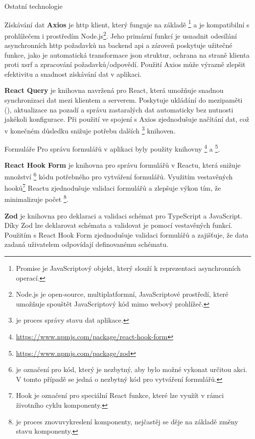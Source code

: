 \begin{subsection}{Ostatní technologie}
\begin{subsubsection}{Získávání dat}
        \textbf{Axios} je \ac{http} klient, který funguje na základě \footnote{Promise je JavaScriptový objekt, který slouží k reprezentaci asynchronních operací.} a je kompatibilní s prohlížečem i prostředím Node.js\footnote{Node.js je open-source, multiplatformní, JavaScriptové prostředí, které umožňuje spouštět JavaScriptový kód mimo webový prohlížeč\cite{n__nodejs_org}.}.
        Jeho primární funkcí je usnadnit odesílání asynchronních \ac{http} požadavků na backend \ac{api} a zároveň poskytuje užitečné funkce, jako je automatická transformace \ac{json} struktur, ochrana na straně klienta proti \ac{xsrf} a zpracování požadavků/odpovědí.
        Použití Axios může výrazně zlepšit efektivitu a snadnost získávání dat v aplikaci.

        \textbf{React Query} je knihovna navržená pro React, která umožňuje snadnou synchronizaci dat mezi klientem a serverem.
        Poskytuje ukládání do mezipaměti (), aktualizace na pozadí a správu zastaralých dat automaticky bez nutnosti jakékoli konfigurace.
        Při použití ve spojení s Axios zjednodušuje načítání dat, což v konečném důsledku snižuje potřebu dalších \footnote{ je proces správy stavu dat aplikace.} knihoven.
    \end{subsubsection}

    \begin{subsubsection}{Formuláře}
        \label{subsubsec:implementace-technologie-ostatni-formulare}
        Pro správu formulářů v aplikaci byly použity knihovny \footnote{\url{https://www.npmjs.com/package/react-hook-form}} a \footnote{\url{https://www.npmjs.com/package/zod}}.

        \textbf{React Hook Form} je knihovna pro správu formulářů v Reactu, která snižuje množství \footnote{ je označení pro kód, který je nezbytný, aby bylo možné vykonat určitou akci.
        V tomto případě se jedná o nezbytný kód pro vytváření formulářů.} kódu potřebného pro vytváření formulářů.
        Využitím vestavěných hooků\footnote{Hook je označení pro speciální React funkce, které lze využít v rámci životního cyklu komponenty\cite{fos_projects_react}.} Reactu zjednodušuje validaci formulářů a zlepšuje výkon tím, že minimalizuje počet \footnote{ je proces znovuvykreslení komponenty, nejčastěj se děje na základě změny stavu komponenty.}.

        \textbf{Zod} je knihovna pro deklaraci a validaci schémat pro TypeScript a JavaScript.
        Díky Zod lze deklarovat schémata a validovat je pomocí vestavěných funkcí.
        Použitím s React Hook Form zjednodušuje validaci formulářů a zajišťuje, že data zadaná uživatelem odpovídají definovanému schématu.
    \end{subsubsection}
\end{subsection}

